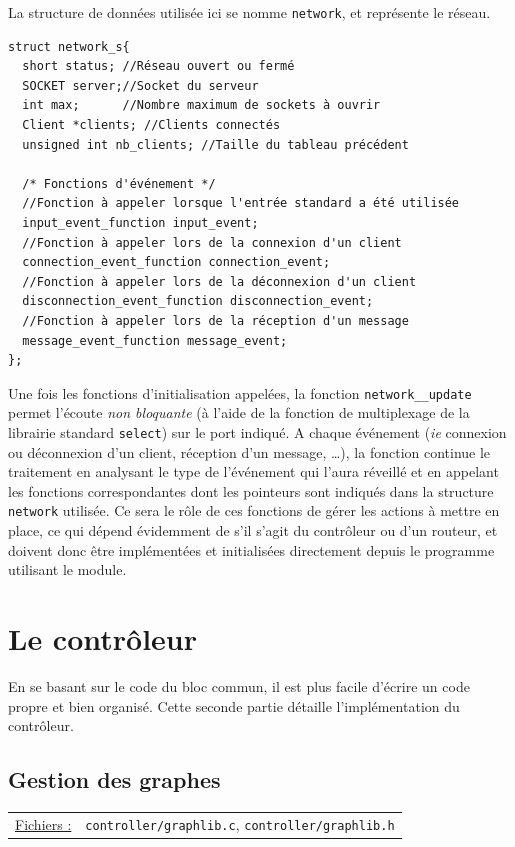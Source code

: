 \documentclass[a4paper,11pt]{article}
\begin{document}
La structure de données utilisée ici se nomme \texttt{network}, et représente le réseau.
\begin{lstlisting}
struct network_s{
  short status; //Réseau ouvert ou fermé
  SOCKET server;//Socket du serveur
  int max;      //Nombre maximum de sockets à ouvrir
  Client *clients; //Clients connectés
  unsigned int nb_clients; //Taille du tableau précédent

  /* Fonctions d'événement */
  //Fonction à appeler lorsque l'entrée standard a été utilisée
  input_event_function input_event;
  //Fonction à appeler lors de la connexion d'un client
  connection_event_function connection_event;
  //Fonction à appeler lors de la déconnexion d'un client
  disconnection_event_function disconnection_event;
  //Fonction à appeler lors de la réception d'un message
  message_event_function message_event;
};
\end{lstlisting}

Une fois les fonctions d'initialisation appelées, la fonction \texttt{network\_\_update} permet l'écoute \textit{non bloquante} (à l'aide de la fonction de multiplexage de la librairie standard \texttt{select}) sur le port indiqué. A chaque événement (\textit{ie} connexion ou déconnexion d'un client, réception d'un message, \dots), la fonction continue le traitement en analysant le type de l'événement qui l'aura réveillé et en appelant les fonctions correspondantes dont les pointeurs sont indiqués dans la structure \texttt{network} utilisée. Ce sera le rôle de ces fonctions de gérer les actions à mettre en place, ce qui dépend évidemment de s'il s'agit du contrôleur ou d'un routeur, et doivent donc être implémentées et initialisées directement depuis le programme utilisant le module.

\newpage
\section{Le contrôleur}

En se basant sur le code du bloc commun, il est plus facile d'écrire un code propre et bien organisé. Cette seconde partie détaille l'implémentation du contrôleur.

\subsection{Gestion des graphes}

\begin{tabularx}{\linewidth}{lX}
\underline{Fichiers :} & \texttt{controller/graphlib.c}, \texttt{controller/graphlib.h}\\
\end{tabularx}\\
\end{document}
